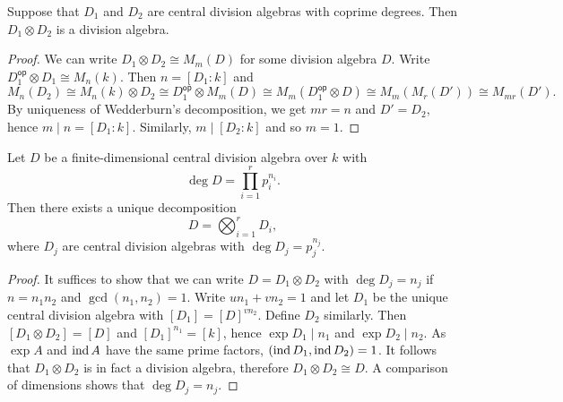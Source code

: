 \begin{trditev}
Suppose that $D_1$ and $D_2$ are central division algebras with
coprime degrees. Then $D_1 \otimes D_2$ is a division algebra.
\end{trditev}

\begin{proof}
We can write $D_1 \otimes D_2 \cong M_m(D)$ for some division
algebra $D$. Write $D_1^{\mathsf{op}} \otimes D_1 \cong M_n(k)$.
Then $n = [D_1 : k]$ and
\[
M_n(D_2) \cong
M_n(k) \otimes D_2 \cong
D_1^{\mathsf{op}} \otimes M_m(D) \cong
M_m(D_1^{\mathsf{op}} \otimes D) \cong
M_m(M_r(D')) \cong
M_{mr}(D').
\]
By uniqueness of Wedderburn's decomposition, we get $mr = n$ and
$D' = D_2$, hence $m \mid n = [D_1 : k]$. Similarly,
$m \mid [D_2 : k]$ and so $m = 1$.
\end{proof}

\begin{izrek}
Let $D$ be a finite-dimensional central division algebra over $k$
with
\[
\deg D = \prod_{i=1}^r p_i^{n_i}.
\]
Then there exists a unique decomposition
\[
D = \bigotimes_{i=1}^r D_i,
\]
where $D_j$ are central division algebras with
$\deg D_j = p_j^{n_j}$.
\end{izrek}

\begin{proof}
It suffices to show that we can write $D = D_1 \otimes D_2$ with
$\deg D_j = n_j$ if $n = n_1 n_2$ and $\gcd(n_1, n_2) = 1$. Write
$u n_1 + v n_2 = 1$ and let $D_1$ be the unique central division
algebra with $[D_1] = [D]^{vn_2}$. Define $D_2$ similarly. Then
$[D_1 \otimes D_2] = [D]$ and $[D_1]^{n_1} = [k]$, hence
$\exp D_1 \mid n_1$ and $\exp D_2 \mid n_2$. As $\exp A$ and
$\operatorname{ind} A$ have the same prime factors, $(\operatorname{ind} D_1, \operatorname{ind} D_2) = 1$.
It follows that $D_1 \otimes D_2$ is in fact a division algebra,
therefore $D_1 \otimes D_2 \cong D$. A comparison of dimensions
shows that $\deg D_j = n_j$.
\end{proof}
